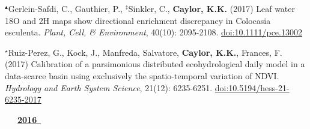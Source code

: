 \begin{etaremune}
\item $^{\blacktriangle}$Gerlein-Safdi, C., Gauthier, P., $^{\ddagger}$Sinkler, C., \textbf{ Caylor, K.K.} (2017) Leaf water 18O and 2H maps show directional enrichment discrepancy in Colocasia esculenta. \emph{Plant, Cell, \& Environment}, 40(10): 2095-2108. \href{https://doi.org/10.1111/pce.13002}{doi:10.1111/pce.13002}
\item $^{\star}$Ruiz-Perez, G., Kock, J., Manfreda, Salvatore, \textbf{ Caylor, K.K.}, Frances, F. (2017) Calibration of a parsimonious distributed ecohydrological daily model in a data-scarce basin using exclusively the spatio-temporal variation of NDVI. \emph{Hydrology and Earth System Science}, 21(12): 6235-6251. \href{https://doi.org/10.5194/hess-21-6235-2017}{doi:10.5194/hess-21-6235-2017}

\vspace{0.1in}
\mbox{\ \ \ \underline{\textbf{2016 }}}
\vspace{0.1in}


\end{etaremune}

